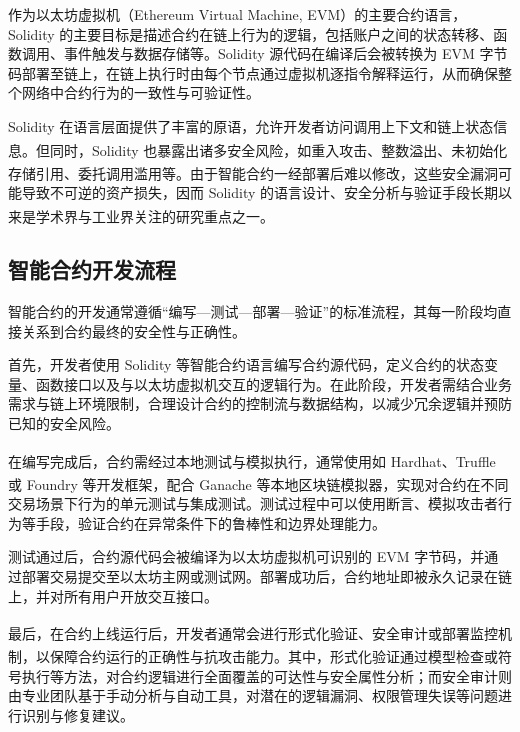 \documentclass[print, master, vlined, timesmath]{DissertUESTC}
\begin{document}
作为以太坊虚拟机（Ethereum Virtual Machine, EVM）的主要合约语言，Solidity 的主要目标是描述合约在链上行为的逻辑，包括账户之间的状态转移、函数调用、事件触发与数据存储等。Solidity 源代码在编译后会被转换为 EVM 字节码部署至链上，在链上执行时由每个节点通过虚拟机逐指令解释运行，从而确保整个网络中合约行为的一致性与可验证性。

Solidity 在语言层面提供了丰富的原语，允许开发者访问调用上下文和链上状态信息\textsuperscript{\cite{...}}。但同时，Solidity 也暴露出诸多安全风险，如重入攻击\textsuperscript{\cite{...}}、整数溢出\textsuperscript{\cite{...}}、未初始化存储引用\textsuperscript{\cite{...}}、委托调用滥用\textsuperscript{\cite{...}}等。由于智能合约一经部署后难以修改，这些安全漏洞可能导致不可逆的资产损失，因而 Solidity 的语言设计、安全分析与验证手段长期以来是学术界与工业界关注的研究重点之一\textsuperscript{\cite{...}}。

\subsection{智能合约开发流程}

智能合约的开发通常遵循“编写—测试—部署—验证”的标准流程，其每一阶段均直接关系到合约最终的安全性与正确性。

首先，开发者使用 Solidity 等智能合约语言编写合约源代码，定义合约的状态变量、函数接口以及与以太坊虚拟机交互的逻辑行为。在此阶段，开发者需结合业务需求与链上环境限制，合理设计合约的控制流与数据结构，以减少冗余逻辑并预防已知的安全风险。

在编写完成后，合约需经过本地测试与模拟执行，通常使用如 Hardhat\textsuperscript{\cite{...}}、Truffle\textsuperscript{\cite{...}} 或 Foundry\textsuperscript{\cite{...}} 等开发框架，配合 Ganache\textsuperscript{\cite{...}} 等本地区块链模拟器，实现对合约在不同交易场景下行为的单元测试与集成测试。测试过程中可以使用断言、模拟攻击者行为等手段，验证合约在异常条件下的鲁棒性和边界处理能力。

测试通过后，合约源代码会被编译为以太坊虚拟机可识别的 EVM 字节码，并通过部署交易提交至以太坊主网或测试网。部署成功后，合约地址即被永久记录在链上，并对所有用户开放交互接口。

最后，在合约上线运行后，开发者通常会进行形式化验证\textsuperscript{\cite{...}}、安全审计\textsuperscript{\cite{...}}或部署监控机制\textsuperscript{\cite{...}}，以保障合约运行的正确性与抗攻击能力。其中，形式化验证通过模型检查或符号执行等方法，对合约逻辑进行全面覆盖的可达性与安全属性分析；而安全审计则由专业团队基于手动分析与自动工具，对潜在的逻辑漏洞、权限管理失误等问题进行识别与修复建议。
\end{document}
